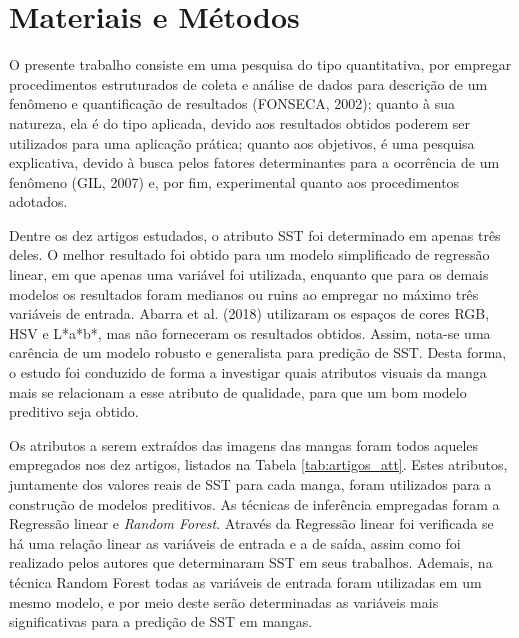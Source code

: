 \chapter{Materiais e Métodos} \label{ch:MM} %

O presente trabalho consiste em uma pesquisa do tipo quantitativa, por empregar procedimentos estruturados de coleta e análise de dados para descrição de um fenômeno e quantificação de resultados (FONSECA, 2002); quanto à sua natureza, ela é do tipo aplicada, devido aos resultados obtidos poderem ser utilizados para uma aplicação prática; quanto aos objetivos, é uma pesquisa explicativa, devido à busca pelos fatores determinantes para a ocorrência de um fenômeno (GIL, 2007) e, por fim, experimental quanto aos procedimentos adotados. 

Dentre os dez artigos estudados, o atributo SST foi determinado em apenas três deles. O melhor resultado foi obtido para um modelo simplificado de regressão linear, em que apenas uma variável foi utilizada, enquanto que para os demais modelos os resultados foram medianos ou ruins ao empregar no máximo três variáveis de entrada. Abarra et al. (2018) utilizaram os espaços de cores RGB, HSV e L*a*b*, mas não forneceram os resultados obtidos. Assim, nota-se uma carência de um modelo robusto e generalista para predição de SST. Desta forma, o estudo foi conduzido de forma a investigar quais atributos visuais da manga mais se relacionam a esse atributo de qualidade, para que um bom modelo preditivo seja obtido.

Os atributos a serem extraídos das imagens das mangas foram todos aqueles empregados nos dez artigos, listados na Tabela \ref{tab:artigos_att}. Estes atributos, juntamente dos valores reais de SST para cada manga, foram utilizados para a construção de modelos preditivos. As técnicas de inferência empregadas foram a Regressão linear e \textit{Random Forest}. Através da Regressão linear foi verificada se há uma relação linear as variáveis de entrada e a de saída, assim como foi realizado pelos autores que determinaram SST em seus trabalhos. Ademais, na técnica Random Forest todas as variáveis de entrada foram utilizadas em um mesmo modelo, e por meio deste serão determinadas as variáveis mais significativas para a predição de SST em mangas. 

